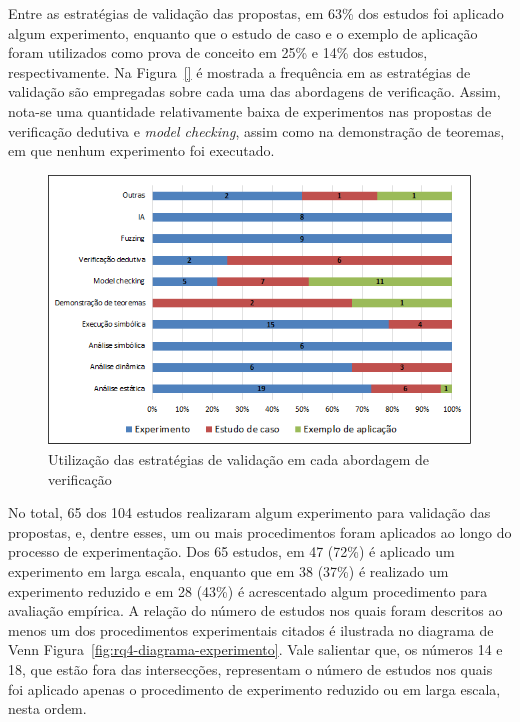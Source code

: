 Entre as estratégias de validação das propostas, em 63\% dos estudos foi aplicado algum experimento, enquanto que o estudo de caso e o exemplo de aplicação foram utilizados como prova de conceito em 25\% e 14\% dos estudos, respectivamente. Na Figura~\ref{} é mostrada a frequência em as estratégias de validação são empregadas sobre cada uma das abordagens de verificação. Assim, nota-se uma quantidade relativamente baixa de experimentos nas propostas de verificação dedutiva e \textit{model checking}, assim como na demonstração de teoremas, em que nenhum experimento foi executado.

\begin{figure}[!htb]
 \caption{Utilização das estratégias de validação em cada abordagem de verificação}
 \label{fig:rq4-validacao-propostas}
 \centering
 \includegraphics[scale=0.65]{figuras/rq4-validacao-propostas.png}
 \fdadospesquisa
\end{figure}

No total, 65 dos 104 estudos realizaram algum experimento para validação das propostas, e, dentre esses, um ou mais procedimentos foram aplicados ao longo do processo de experimentação. Dos 65 estudos, em 47 (72\%) é aplicado um experimento em larga escala, enquanto que em 38 (37\%) é realizado um experimento reduzido e em 28 (43\%) é acrescentado algum procedimento para avaliação empírica. A relação do número de estudos nos quais foram descritos ao menos um dos procedimentos experimentais citados é ilustrada no diagrama de Venn Figura~\ref{fig:rq4-diagrama-experimento}. Vale salientar que, os números 14 e 18, que estão fora das intersecções, representam o número de estudos nos quais foi aplicado apenas o procedimento de experimento reduzido ou em larga escala, nesta ordem.

